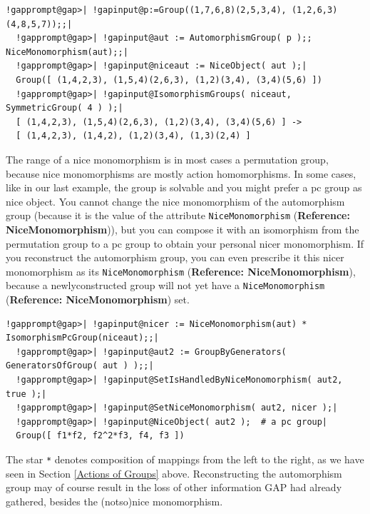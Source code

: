 \documentclass[a4paper,11pt]{report}
\begin{document}
{{ 
\begin{Verbatim}[commandchars=!@|,fontsize=\small,frame=single,label=Example]
  !gapprompt@gap>| !gapinput@p:=Group((1,7,6,8)(2,5,3,4), (1,2,6,3)(4,8,5,7));;|
  !gapprompt@gap>| !gapinput@aut := AutomorphismGroup( p );; NiceMonomorphism(aut);;|
  !gapprompt@gap>| !gapinput@niceaut := NiceObject( aut );|
  Group([ (1,4,2,3), (1,5,4)(2,6,3), (1,2)(3,4), (3,4)(5,6) ])
  !gapprompt@gap>| !gapinput@IsomorphismGroups( niceaut, SymmetricGroup( 4 ) );|
  [ (1,4,2,3), (1,5,4)(2,6,3), (1,2)(3,4), (3,4)(5,6) ] ->
  [ (1,4,2,3), (1,4,2), (1,2)(3,4), (1,3)(2,4) ]
\end{Verbatim}
 

 The range of a nice monomorphism is in most cases a permutation group, because
nice monomorphisms are mostly action homomorphisms. In some cases, like in our
last example, the group is solvable and you might prefer a pc group as nice
object. You cannot change the nice monomorphism of the automorphism group
(because it is the value of the attribute \texttt{NiceMonomorphism} (\textbf{Reference: NiceMonomorphism})), but you can compose it with an isomorphism from the permutation group to a
pc group to obtain your personal nicer monomorphism. If you reconstruct the
automorphism group, you can even prescribe it this nicer monomorphism as its \texttt{NiceMonomorphism} (\textbf{Reference: NiceMonomorphism}), because a newly\texttt{}constructed group will not yet have a \texttt{NiceMonomorphism} (\textbf{Reference: NiceMonomorphism}) set. 

 
\begin{Verbatim}[commandchars=!@|,fontsize=\small,frame=single,label=Example]
  !gapprompt@gap>| !gapinput@nicer := NiceMonomorphism(aut) * IsomorphismPcGroup(niceaut);;|
  !gapprompt@gap>| !gapinput@aut2 := GroupByGenerators( GeneratorsOfGroup( aut ) );;|
  !gapprompt@gap>| !gapinput@SetIsHandledByNiceMonomorphism( aut2, true );|
  !gapprompt@gap>| !gapinput@SetNiceMonomorphism( aut2, nicer );|
  !gapprompt@gap>| !gapinput@NiceObject( aut2 );  # a pc group|
  Group([ f1*f2, f2^2*f3, f4, f3 ])
\end{Verbatim}
 

 The star \texttt{*} denotes composition of mappings from the left to the right, as we have seen in
Section \ref{Actions of Groups} above. Reconstructing the automorphism group may of course result in the loss
of other information \textsf{GAP} had already gathered, besides the
(not\texttt{}so\texttt{})nice monomorphism. 

}}
\end{document}
